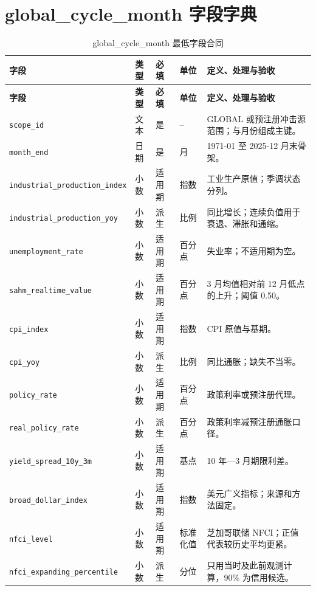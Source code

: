 \documentclass[UTF8,fontset=windows,12pt,openany]{ctexbook}
\newcommand{\Field}[1]{{\small\nolinkurl{#1}}}
\begin{document}
\chapter{global\_cycle\_month 字段字典}
\clearpage
\begin{landscape}

\begin{longtable}{p{4.0cm}p{2.0cm}p{2.2cm}p{2.8cm}p{7.3cm}}
\caption{global\_cycle\_month 最低字段合同}\label{tab:dict-global-cycle}\\
\toprule
\textbf{字段} & \textbf{类型} & \textbf{必填} & \textbf{单位} & \textbf{定义、处理与验收}\\
\midrule
\endfirsthead
\toprule \textbf{字段} & \textbf{类型} & \textbf{必填} & \textbf{单位} & \textbf{定义、处理与验收}\\ \midrule
\endhead
\Field{scope_id} & 文本 & 是 & -- & GLOBAL 或预注册冲击源范围；与月份组成主键。\\
\Field{month_end} & 日期 & 是 & 月 & 1971-01 至 2025-12 月末骨架。\\
\Field{industrial_production_index} & 小数 & 适用期 & 指数 & 工业生产原值；季调状态分列。\\
\Field{industrial_production_yoy} & 小数 & 派生 & 比例 & 同比增长；连续负值用于衰退、滞胀和通缩。\\
\Field{unemployment_rate} & 小数 & 适用期 & 百分点 & 失业率；不适用期为空。\\
\Field{sahm_realtime_value} & 小数 & 适用期 & 百分点 & 3 月均值相对前 12 月低点的上升；阈值 0.50\cite{sahmfred}。\\
\Field{cpi_index} & 小数 & 适用期 & 指数 & CPI 原值与基期。\\
\Field{cpi_yoy} & 小数 & 派生 & 比例 & 同比通胀；缺失不当零。\\
\Field{policy_rate} & 小数 & 适用期 & 百分点 & 政策利率或预注册代理。\\
\Field{real_policy_rate} & 小数 & 派生 & 百分点 & 政策利率减预注册通胀口径。\\
\Field{yield_spread_10y_3m} & 小数 & 适用期 & 基点 & 10 年—3 月期限利差。\\
\Field{broad_dollar_index} & 小数 & 适用期 & 指数 & 美元广义指标；来源和方法固定。\\
\Field{nfci_level} & 小数 & 适用期 & 标准化值 & 芝加哥联储 NFCI；正值代表较历史平均更紧\cite{nfciofficial,nfcifred}。\\
\Field{nfci_expanding_percentile} & 小数 & 派生 & 分位 & 只用当时及此前观测计算，90\% 为信用候选。\\

\end{longtable}
\end{landscape}
\end{document}
